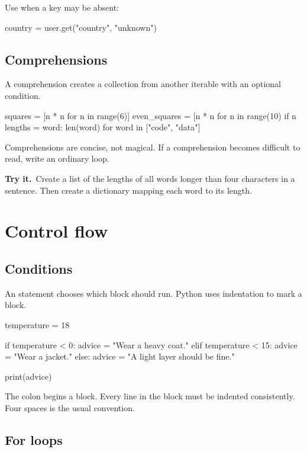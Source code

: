 \documentclass[11pt,openany,oneside]{book}
\newcommand{\inlinecode}[1]{\texttt{\small\detokenize{#1}}}
\newcommand{\tryit}{\textsf{\bfseries\color{orange}Try it.}\ }
\begin{document}
Use \inlinecode{get} when a key may be absent:

\begin{code}[language=Python]
country = user.get("country", "unknown")
\end{code}

\section{Comprehensions}

A comprehension creates a collection from another iterable with an optional condition.

\begin{code}[language=Python]
squares = [n * n for n in range(6)]
even_squares = [n * n for n in range(10) if n %
lengths = {word: len(word) for word in ["code", "data"]}
\end{code}

Comprehensions are concise, not magical. If a comprehension becomes difficult to read, write an ordinary loop.

\begin{exercisebox}
\tryit Create a list of the lengths of all words longer than four characters in a sentence. Then create a dictionary mapping each word to its length.
\end{exercisebox}

\chapter{Control flow}

\section{Conditions}

An \inlinecode{if} statement chooses which block should run. Python uses indentation to mark a block.

\begin{code}[language=Python]
temperature = 18

if temperature < 0:
    advice = "Wear a heavy coat."
elif temperature < 15:
    advice = "Wear a jacket."
else:
    advice = "A light layer should be fine."

print(advice)
\end{code}

The colon begins a block. Every line in the block must be indented consistently. Four spaces is the usual convention.

\section{For loops}
\end{document}
